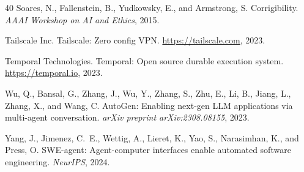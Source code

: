 \documentclass[11pt]{article}
\begin{document}
\begin{thebibliography}{40}
Soares, N., Fallenstein, B., Yudkowsky, E., and Armstrong, S.
\newblock Corrigibility.
\newblock \emph{AAAI Workshop on AI and Ethics}, 2015.

Tailscale Inc.
\newblock Tailscale: Zero config VPN.
\newblock \url{https://tailscale.com}, 2023.

Temporal Technologies.
\newblock Temporal: Open source durable execution system.
\newblock \url{https://temporal.io}, 2023.

Wu, Q., Bansal, G., Zhang, J., Wu, Y., Zhang, S., Zhu, E., Li, B., Jiang, L.,
  Zhang, X., and Wang, C.
\newblock AutoGen: Enabling next-gen LLM applications via multi-agent conversation.
\newblock \emph{arXiv preprint arXiv:2308.08155}, 2023.

Yang, J., Jimenez, C.~E., Wettig, A., Lieret, K., Yao, S., Narasimhan, K.,
  and Press, O.
\newblock SWE-agent: Agent-computer interfaces enable automated software
  engineering.
\newblock \emph{NeurIPS}, 2024.

\end{thebibliography}
\end{document}
